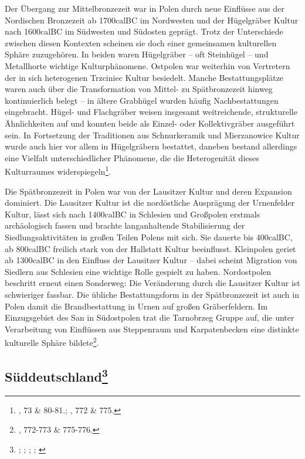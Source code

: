 \documentclass[openany,twoside,twocolumn]{book}
\let\rmarkdownfootnote\footnote%
\def\footnote{\protect\rmarkdownfootnote}
\begin{document}
Der Übergang zur Mittelbronzezeit war in Polen durch neue Einflüsse aus
der Nordischen Bronzezeit ab 1700calBC im Nordwesten und der Hügelgräber
Kultur nach 1600calBC im Südwesten und Südosten geprägt. Trotz der
Unterschiede zwischen diesen Kontexten scheinen sie doch einer
gemeinsamen kulturellen Sphäre zuzugehören. In beiden waren Hügelgräber
-- oft Steinhügel -- und Metallhorte wichtige Kulturphänomene. Ostpolen
war weiterhin von Vertretern der in sich heterogenen Trzciniec Kultur
besiedelt. Manche Bestattungsplätze waren auch über die Transformation
von Mittel- zu Spätbronzezeit hinweg kontinuierlich belegt -- in ältere
Grabhügel wurden häufig Nachbestattungen eingebracht. Hügel- und
Flachgräber weisen insgesamt weitreichende, strukturelle Ähnlichkeiten
auf und konnten beide als Einzel- oder Kollektivgräber ausgeführt sein.
In Fortsetzung der Traditionen aus Schnurkeramik und Mierzanowice Kultur
wurde auch hier vor allem in Hügelgräbern bestattet, daneben bestand
allerdings eine Vielfalt unterschiedlicher Phänomene, die die
Heterogenität dieses Kulturraumes widerspiegeln\footnote{\textcite{dabrowski_aeltere_2004},
  73 \& 80-81.; \textcite{czebreszuk_bronze_2013}, 772 \& 775.}.

Die Spätbronzezeit in Polen war von der Lausitzer Kultur und deren
Expansion dominiert. Die Lausitzer Kultur ist die nordöstliche
Ausprägung der Urnenfelder Kultur, lässt sich nach 1400calBC in
Schlesien und Großpolen erstmals archäologisch fassen und brachte
langanhaltende Stabilisierung der Siedlungsaktivitäten in großen Teilen
Polens mit sich. Sie dauerte bis 400calBC, ab 800calBC freilich stark
von der Hallstatt Kultur beeinflusst. Kleinpolen geriet ab 1300calBC in
den Einfluss der Lausitzer Kultur -- dabei scheint Migration von
Siedlern aus Schlesien eine wichtige Rolle gespielt zu haben.
Nordostpolen beschritt erneut einen Sonderweg: Die Veränderung durch die
Lausitzer Kultur ist schwieriger fassbar. Die übliche Bestattungsform in
der Spätbronzezeit ist auch in Polen damit die Brandbestattung in Urnen
auf großen Gräberfeldern. Im Einzugsgebiet des San in Südostpolen trat
die Tarnobrzeg Gruppe auf, die unter Verarbeitung von Einflüssen aus
Steppenraum und Karpatenbecken eine distinkte kulturelle Sphäre
bildete\footnote{\textcite{czebreszuk_bronze_2013}, 772-773 \& 775-776.}.

\hypertarget{suddeutschland}{%
\subsection[Süddeutschland]{\texorpdfstring{Süddeutschland\footnote{\textcite{falkenstein_development_2012};
  \textcite{falkenstein_zum_2017}; \textcite{jockenhovel_germany_2013};
  \textcite{kreutle_urnenfelderkultur_2007};
  \textcite{wiesner_grabbau_2009}}}{Süddeutschland}}\label{suddeutschland}}
\end{document}

